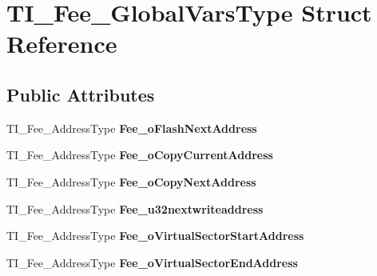 \hypertarget{structTI__Fee__GlobalVarsType}{}\section{T\+I\+\_\+\+Fee\+\_\+\+Global\+Vars\+Type Struct Reference}
\label{structTI__Fee__GlobalVarsType}
\subsection*{Public Attributes}
\begin{DoxyCompactItemize}
\item 
\mbox{\label{structTI__Fee__GlobalVarsType_a6221069831465d0e126983930ac87dcc}} 
T\+I\+\_\+\+Fee\+\_\+\+Address\+Type {\bfseries Fee\+\_\+o\+Flash\+Next\+Address}
\item 
\mbox{\label{structTI__Fee__GlobalVarsType_a6e8a2d44ac48e559a5a8f0cb329cbacf}} 
T\+I\+\_\+\+Fee\+\_\+\+Address\+Type {\bfseries Fee\+\_\+o\+Copy\+Current\+Address}
\item 
\mbox{\label{structTI__Fee__GlobalVarsType_ac368c25d648b94f23bfc458a62044808}} 
T\+I\+\_\+\+Fee\+\_\+\+Address\+Type {\bfseries Fee\+\_\+o\+Copy\+Next\+Address}
\item 
\mbox{\label{structTI__Fee__GlobalVarsType_a90a97a1040e74809b363ea1eb39bec28}} 
T\+I\+\_\+\+Fee\+\_\+\+Address\+Type {\bfseries Fee\+\_\+u32nextwriteaddress}
\item 
\mbox{\label{structTI__Fee__GlobalVarsType_a40b4b3cce02bd9ce62be34136dd0f27f}} 
T\+I\+\_\+\+Fee\+\_\+\+Address\+Type {\bfseries Fee\+\_\+o\+Virtual\+Sector\+Start\+Address}
\item 
\mbox{\label{structTI__Fee__GlobalVarsType_a36260ce960dc1743b63a7b02e978cae3}} 
T\+I\+\_\+\+Fee\+\_\+\+Address\+Type {\bfseries Fee\+\_\+o\+Virtual\+Sector\+End\+Address}
\item 
\mbox{\label{structTI__Fee__GlobalVarsType_abe71e311188d9715f934c299fc0c0619}} 

\end{DoxyCompactItemize}
